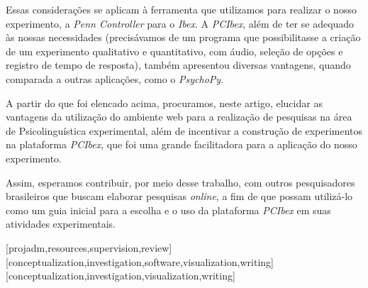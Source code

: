 \documentclass{textolivre}
\begin{document}
Essas considerações se aplicam à ferramenta que utilizamos para realizar o nosso experimento, a \emph{Penn Controller} para o \emph{Ibex}. A \emph{PCIbex}, além de ter se adequado às nossas necessidades (precisávamos de um programa que possibilitasse a criação de um experimento qualitativo e quantitativo, com áudio, seleção de opções e registro de tempo de resposta), também apresentou diversas vantagens, quando comparada a outras aplicações, como o \emph{PsychoPy}.

A partir do que foi elencado acima, procuramos, neste artigo, elucidar as vantagens da utilização do ambiente web para a realização de pesquisas na área de Psicolinguística experimental, além de incentivar a construção de experimentos na plataforma \emph{PCIbex}, que foi uma grande facilitadora para a aplicação do nosso experimento.

Assim, esperamos contribuir, por meio desse trabalho, com outros pesquisadores brasileiros que buscam elaborar pesquisas \textit{online}, a fim de que possam utilizá-lo como um guia inicial para a escolha e o uso da plataforma \emph{PCIbex} em suas atividades experimentais.


\printbibliography\label{sec-bib}

\begin{contributors}
[projadm,resources,supervision,review]
[conceptualization,investigation,software,visualization,writing]
[conceptualization,investigation,visualization,writing]
\end{contributors}
\end{document}
